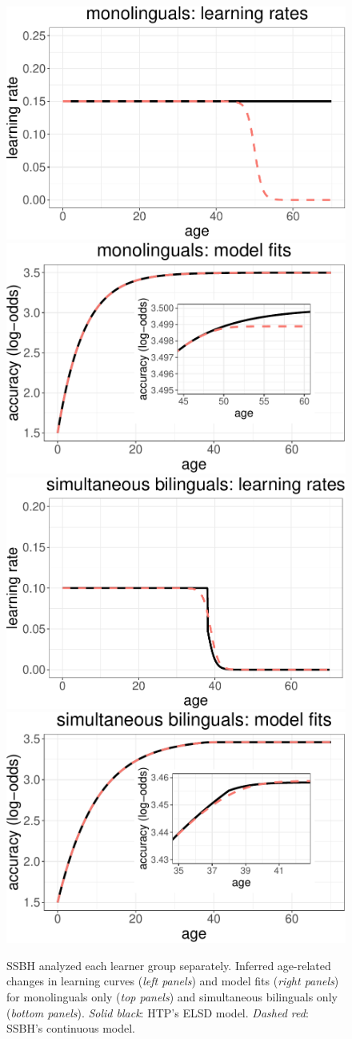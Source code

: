 \documentclass[
  english,
  doc,floatsintext]{apa6}
\begin{document}
\begin{figure}
\includegraphics[width=0.48\linewidth]{SlikResponse_rmd_files/figure-latex/natives-1} \includegraphics[width=0.48\linewidth]{SlikResponse_rmd_files/figure-latex/natives-2} \includegraphics[width=0.48\linewidth]{SlikResponse_rmd_files/figure-latex/natives-3} \includegraphics[width=0.48\linewidth]{SlikResponse_rmd_files/figure-latex/natives-4} \caption{SSBH analyzed each learner group separately. Inferred age-related changes in learning curves (\emph{left panels}) and model fits (\emph{right panels}) for monolinguals only (\emph{top panels}) and simultaneous bilinguals only (\emph{bottom panels}). \emph{Solid black}: HTP's ELSD model. \emph{Dashed red}: SSBH's continuous model.}\label{fig:natives}
\end{figure}
\end{document}
